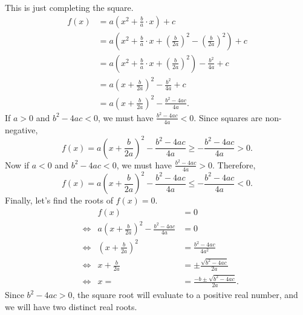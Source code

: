 \begin{solution}
    This is just completing the square.
    \begin{align*}
        f(x) &= a \left( x^2 + \frac{b}{a} \cdot x \right) + c\\
        &= a \left( x^2 + \frac{b}{a} \cdot x + \left( \frac{b}{2a} \right)^2 - \left( \frac{b}{2a} \right)^2 \right) + c\\
        &= a \left( x^2 + \frac{b}{a} \cdot x + \left( \frac{b}{2a} \right)^2 \right) - \frac{b^2}{4a} + c\\
        &= a \left( x + \frac{b}{2a} \right)^2 - \frac{b^2}{4a} + c\\
        &= a \left( x + \frac{b}{2a} \right)^2 - \frac{b^2 - 4ac}{4a}.
    \end{align*}
    If $a > 0$ and $b^2 - 4ac < 0$, we must have $\frac{b^2 - 4ac}{4a} < 0$.
    Since squares are non-negative,
    \[ f(x) = a \left( x + \frac{b}{2a} \right)^2 - \frac{b^2 - 4ac}{4a} \geq
    -\frac{b^2 - 4ac}{4a} > 0. \]
    Now if $a < 0$ and $b^2 - 4ac < 0$, we must have $\frac{b^2 - 4ac}{4a} >
    0$. Therefore,
    \[ f(x) = a \left( x + \frac{b}{2a} \right)^2 - \frac{b^2 - 4ac}{4a} \leq
    -\frac{b^2 - 4ac}{4a} < 0. \]
    Finally, let's find the roots of $f(x) = 0$.
    \begin{align*}
        && f(x) &= 0\\
        &\Longleftrightarrow& a \left( x + \frac{b}{2a} \right)^2 - \frac{b^2 - 4ac}{4a} &= 0\\
        &\Longleftrightarrow& \left( x + \frac{b}{2a} \right)^2 &= \frac{b^2 - 4ac}{4a^2}\\
        &\Longleftrightarrow& x + \frac{b}{2a} &= \pm \frac{\sqrt{b^2 - 4ac}}{2a}\\
        &\Longleftrightarrow& x = &= \frac{-b \pm \sqrt{b^2 - 4ac}}{2a}. 
    \end{align*}
    Since $b^2 - 4ac > 0$, the square root will evaluate to a positive real
    number, and we will have two distinct real roots.
\end{solution}

